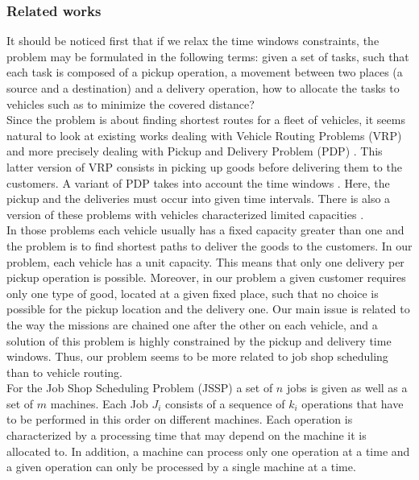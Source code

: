 \documentclass[a4paper,10pt]{article}
\begin{document}
\subsubsection{Related works}

It should be noticed first that if we relax the time windows constraints, the problem may be formulated in the following terms: given a set of tasks, such that each task is composed of a pickup operation, a movement between two places (a source and a destination) and a delivery operation, how to allocate the tasks to vehicles such as to minimize the covered distance? \\%


Since the problem is about finding shortest routes for a fleet of vehicles, it seems natural to look at existing works dealing with Vehicle Routing Problems (VRP) \cite{Toth2001,Laporte1992} and more precisely dealing with Pickup and Delivery Problem (PDP) \cite{Berbeglia2007}. This latter version of VRP consists in picking up goods before delivering them to the customers. A variant of PDP takes into account the time windows \cite{Mitrovic1998}. Here, the pickup and the deliveries must occur into given time intervals. There is also a version of these problems with vehicles characterized limited capacities \cite{Toth2001}. \\

In those problems each vehicle usually has a fixed capacity greater than one and the problem is to find shortest paths to deliver the goods to the customers. In our problem, each vehicle has a unit capacity. This means that only one delivery per pickup operation is possible. Moreover, in our problem a given customer requires only one type of good, located at a given fixed place, such that no choice is possible for the pickup location and the delivery one. Our main issue is related to the way the missions are chained one after the other on each vehicle, and a solution of this problem is highly constrained by the pickup and delivery time windows. Thus, our problem seems to be more related to job shop scheduling than to vehicle routing.\\

For the Job Shop Scheduling Problem (JSSP) a set of $n$ jobs is given as well as a set of $m$ machines. Each Job $J_i$ consists of a sequence of $k_i$ operations that have to be performed in this order on different machines. Each operation is characterized by a processing time that may depend on the machine it is allocated to. In addition, a machine can process only one operation at a time and a given operation can only be processed by a single machine at a time. \\
\end{document}
